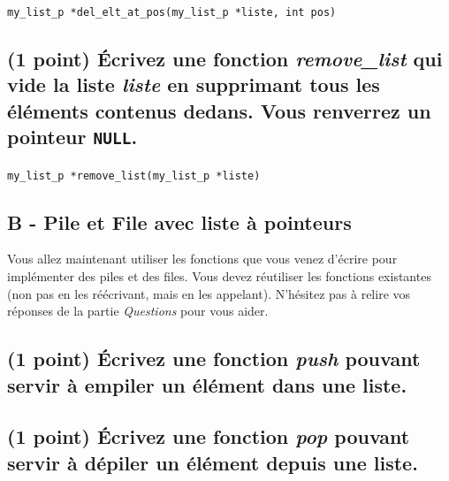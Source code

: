 \documentclass[11pt,a4paper]{article}
\begin{document}
\bigskip

\texttt{my\_list\_p *del\_elt\_at\_pos(my\_list\_p *liste, int pos)}

\begin{center}
\end{center}

\newpage

\subsection{(1 point) \'Ecrivez une fonction \og \textit{remove\_list} \fg{} qui vide la liste \textit{liste} en supprimant tous les éléments contenus dedans. Vous renverrez un pointeur \texttt{NULL}. }

\bigskip

\texttt{my\_list\_p *remove\_list(my\_list\_p *liste)}

\begin{center}
\end{center}




\subsection*{B - Pile et File avec liste à pointeurs}

Vous allez maintenant utiliser les fonctions que vous venez d'écrire pour implémenter des piles et des files.
Vous devez réutiliser les fonctions existantes (non pas en les réécrivant, mais en les appelant).
N'hésitez pas à relire vos réponses de la partie \textit{Questions} pour vous aider.

\subsection{(1 point) \'Ecrivez une fonction \og \textit{push} \fg{} pouvant servir à empiler un élément dans une liste. }

\bigskip

\begin{center}
\end{center}

\newpage

\subsection{(1 point) \'Ecrivez une fonction \og \textit{pop} \fg{} pouvant servir à dépiler un élément depuis une liste. }
\end{document}
